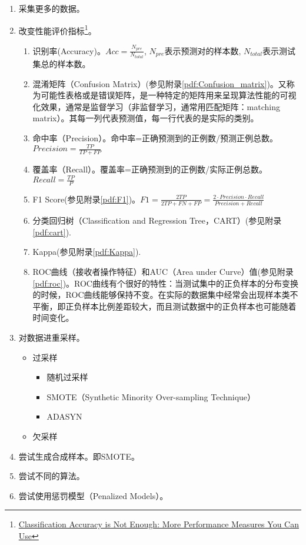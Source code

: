 \documentclass[UTF8,a4paper,12pt, onecolumn]{ctexart}
\begin{document}
\begin{enumerate}
  \item 采集更多的数据。
  \item 改变性能评价指标\footnote{\href{https://machinelearningmastery.com/classification-accuracy-is-not-enough-more-performance-measures-you-can-use/}{Classification Accuracy is Not Enough: More Performance Measures You Can Use}}。
	\begin{enumerate}
	  \item 识别率(Accuracy)。$ Acc = \frac{N_{pre}}{N_{total}} $, $N_{pre}$表示预测对的样本数, $N_{total}$表示测试集总的样本数。
	  \item 混淆矩阵（Confusion Matrix）(参见附录\ref{pdf:Confusion_matrix})。又称为可能性表格或是错误矩阵，是一种特定的矩阵用来呈现算法性能的可视化效果，通常是监督学习（非监督学习，通常用匹配矩阵：matching matrix）。其每一列代表预测值，每一行代表的是实际的类别。
	  \item 命中率（Precision）。命中率=正确预测到的正例数/预测正例总数。$ Precision = \frac{TP}{TP+FP}$
	  \item 覆盖率（Recall）。覆盖率=正确预测到的正例数/实际正例总数。$ Recall = \frac{TP}{P} $
	  \item F1 Score(参见附录\ref{pdf:F1})。$F1=\frac{2TP}{2TP+FN+FP}=\frac{2 \cdot Precision \cdot Recall}{Precision+Recall}$
	  \item 分类回归树（Classification and Regression Tree，CART）(参见附录\ref{pdf:cart}).
	  \item Kappa(参见附录\ref{pdf:Kappa}).
	  \item ROC曲线（接收者操作特征）和AUC（Area under Curve）值(参见附录\ref{pdf:roc})。ROC曲线有个很好的特性：当测试集中的正负样本的分布变换的时候，ROC曲线能够保持不变。在实际的数据集中经常会出现样本类不平衡，即正负样本比例差距较大，而且测试数据中的正负样本也可能随着时间变化。
	  
	\end{enumerate}

  \item 对数据进重采样。
	\begin{itemize}
	  \item 过采样
	  \begin{itemize}
		  \item 随机过采样
		  \item SMOTE（Synthetic Minority Over-sampling Technique）
		  \item ADASYN
		\end{itemize}
	  \item 欠采样
	\end{itemize}

  \item 尝试生成合成样本。即SMOTE。
  \item 尝试不同的算法。
  \item 尝试使用惩罚模型（Penalized Models）。
\end{enumerate}
\end{document}
